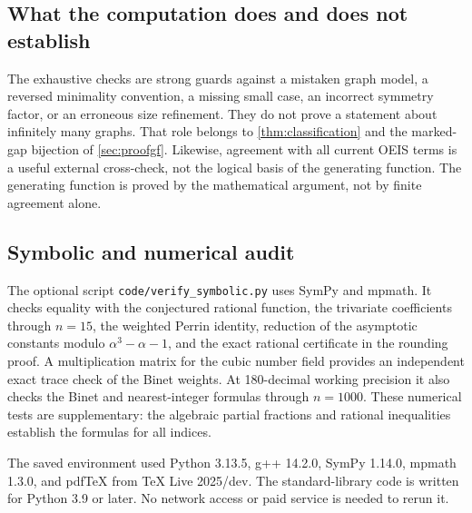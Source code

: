 \documentclass[11pt,letterpaper]{article}
\numberwithin{equation}{section}
\theoremstyle{definition}
\newcommand{\1}{\mathbf 1}
\begin{document}
\subsection{What the computation does and does not establish}
The exhaustive checks are strong guards against a mistaken graph model, a
reversed minimality convention, a missing small case, an incorrect symmetry
factor, or an erroneous size refinement. They do not prove a statement about
infinitely many graphs. That role belongs to \cref{thm:classification} and the
marked-gap bijection of \cref{sec:proofgf}. Likewise, agreement with all
current OEIS terms is a useful external cross-check, not the logical basis of
the generating function. The generating function is proved by the mathematical
argument, not by finite agreement alone.

\subsection{Symbolic and numerical audit}
The optional script \texttt{code/verify\_symbolic.py} uses SymPy and mpmath.
It checks equality with the conjectured rational function, the trivariate
coefficients through $n=15$, the weighted Perrin identity, reduction of the
asymptotic constants modulo $\alpha^3-\alpha-1$, and the exact rational
certificate in the rounding proof. A multiplication matrix for the cubic
number field provides an independent exact trace check of the Binet weights.
At 180-decimal working precision it also checks the Binet and nearest-integer
formulas through $n=1000$. These numerical tests are supplementary: the
algebraic partial fractions and rational inequalities establish the formulas
for all indices.

The saved environment used Python 3.13.5, g++ 14.2.0, SymPy 1.14.0, mpmath 1.3.0,
and pdfTeX from TeX Live 2025/dev. The standard-library code is written for
Python 3.9 or later. No network access or paid service is needed to rerun it.
\end{document}
